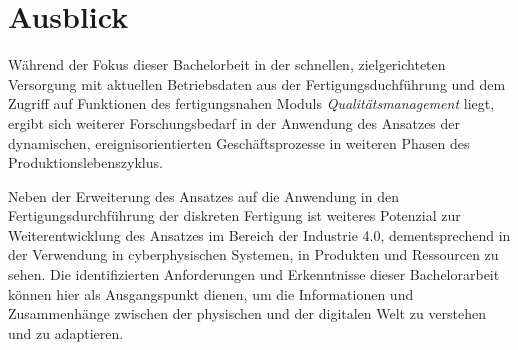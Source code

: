 \section{Ausblick}\label{sec:ausblick}
Während der Fokus dieser Bachelorbeit in der schnellen, zielgerichteten Versorgung mit aktuellen Betriebsdaten aus der Fertigungsduchführung und dem Zugriff auf Funktionen des fertigungsnahen Moduls \textit{Qualitätsmanagement} liegt, ergibt sich weiterer Forschungsbedarf in der Anwendung des Ansatzes der dynamischen, ereignisorientierten Geschäftsprozesse in weiteren Phasen des Produktionslebenszyklus. 

Neben der Erweiterung des Ansatzes auf die Anwendung in den Fertigungsdurchführung der diskreten Fertigung ist weiteres Potenzial zur Weiterentwicklung des Ansatzes im Bereich der Industrie 4.0, dementsprechend in der Verwendung in cyberphysischen Systemen, in Produkten und Ressourcen zu sehen. Die identifizierten Anforderungen und Erkenntnisse dieser Bachelorarbeit können hier als Ausgangspunkt dienen, um die Informationen und Zusammenhänge zwischen der physischen und der digitalen Welt zu verstehen und zu adaptieren.

